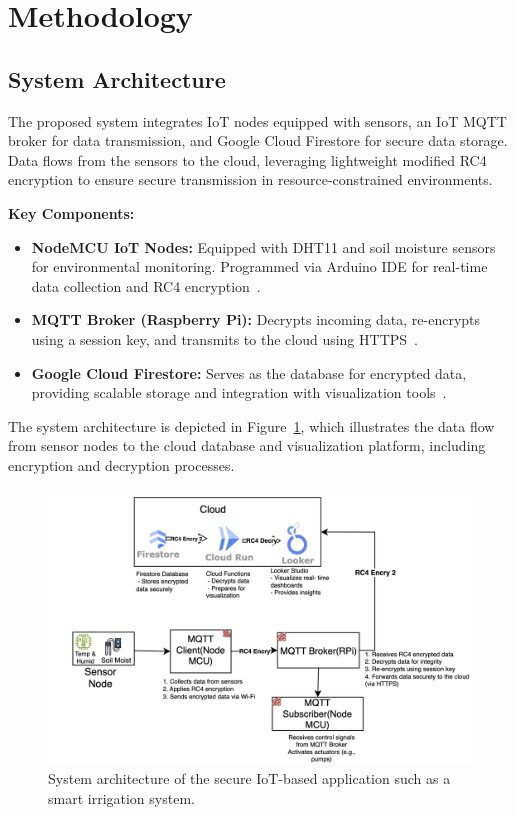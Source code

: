 \documentclass[runningheads]{llncs}
\begin{document}
\section{Methodology}
\subsection{System Architecture}

The proposed system integrates IoT nodes equipped with sensors, an IoT MQTT broker for data transmission, and Google Cloud Firestore for secure data storage. Data flows from the sensors to the cloud, leveraging lightweight modified RC4 encryption to ensure secure transmission in resource-constrained environments.

\textbf{Key Components:}
\begin{itemize}
    \item \textbf{NodeMCU IoT Nodes:} Equipped with DHT11 and soil moisture sensors for environmental monitoring. Programmed via Arduino IDE for real-time data collection and RC4 encryption~\cite{ref8}.
    \item \textbf{MQTT Broker (Raspberry Pi):} Decrypts incoming data, re-encrypts using a session key, and transmits to the cloud using HTTPS~\cite{ref7}.
    \item \textbf{Google Cloud Firestore:} Serves as the database for encrypted data, providing scalable storage and integration with visualization tools~\cite{ref9}.
\end{itemize}

The system architecture is depicted in Figure~\ref{fig:system_architecture}, which illustrates the data flow from sensor nodes to the cloud database and visualization platform, including encryption and decryption processes.

\begin{figure}[H]
\centering
\includegraphics[width=\textwidth]{detailed_arch.png} %
\caption{System architecture of the secure IoT-based application such as a smart irrigation system.}
\label{fig:system_architecture}
\end{figure}
\end{document}
